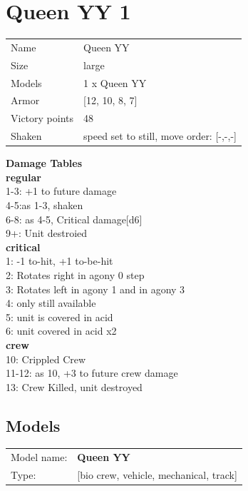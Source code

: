 \clearpage

\section{ Queen YY 1 }

\begin{tabular}{ll}
  Name & Queen YY \\
  Size & large\\
  Models & 1 x Queen YY\\
  Armor & [12, 10, 8, 7]\\
  Victory points & 48\\
  Shaken & speed set to still, move order: [-,-,-]\\
\end{tabular}




{\bf Damage Tables} \\
 {\bf regular } \\
1-3: +1 to future damage \\
4-5:as 1-3, shaken \\
6-8: as 4-5, Critical damage[d6] \\
9+: Unit destroied \\
 {\bf critical } \\
1: -1 to-hit, +1 to-be-hit \\
2: Rotates right in agony 0 step \\
3: Rotates left in agony 1 and in agony 3 \\
4: only still available \\
5: unit is covered in acid \\
6: unit covered in acid x2 \\
 {\bf crew } \\
10: Crippled Crew \\
11-12: as 10, +3 to future crew damage \\
13: Crew Killed, unit destroyed \\


\clearpage

\subsection{ Models }

\begin{tabular}{ll}
Model name: & {\bf Queen YY } \\
Type: & [bio crew, vehicle, mechanical, track] \\
\end{tabular}

